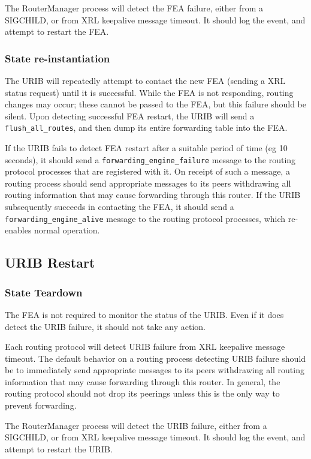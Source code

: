 \documentclass[11pt]{article}
\begin{document}
The RouterManager process will detect the FEA failure,
either from a SIGCHILD, or from XRL keepalive message timeout.  It
should log the event, and attempt to restart the FEA.

\subsubsection*{State re-instantiation}
The URIB will repeatedly attempt to contact the new FEA (sending a XRL
status request) until it is successful.  While the FEA is not
responding, routing changes may occur; these cannot be passed to the
FEA, but this failure should be silent.  Upon detecting successful FEA
restart, the URIB will send a {\tt flush\_all\_routes}, and then dump
its entire forwarding table into the FEA.

If the URIB fails to detect FEA restart after a suitable period of
time (eg 10 seconds), it should send a {\tt forwarding\_engine\_failure}
message to the routing protocol processes that are registered with
it. On receipt of such a message, a routing process should send
appropriate messages to its peers withdrawing all routing information
that may cause forwarding through this router.  If the URIB
subsequently succeeds in contacting the FEA, it should send a
{\tt forwarding\_engine\_alive} message to the routing protocol
processes, which re-enables normal operation.

\subsection{URIB Restart}

\subsubsection*{State Teardown}
The FEA is not required to monitor the status of the URIB.  Even if it
does detect the URIB failure, it should not take any action.

Each routing protocol will detect URIB failure from XRL keepalive
message timeout.  The default behavior on a routing process detecting
URIB failure should be to immediately send appropriate messages to its
peers withdrawing all routing information that may cause forwarding
through this router. In general, the routing protocol should not
drop its peerings unless this is the only way to prevent forwarding.  

The RouterManager process will detect the URIB failure,
either from a SIGCHILD, or from XRL keepalive message timeout.  It
should log the event, and attempt to restart the URIB.
\end{document}
